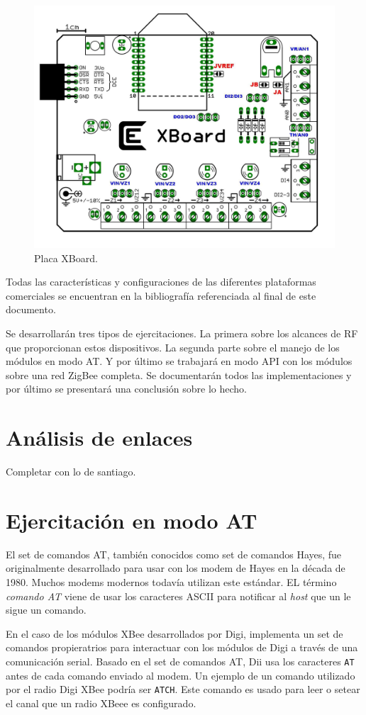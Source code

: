 \documentclass[11pt,oneside,spanish,a4paper]{article}
\begin{document}
\begin{figure}[ht]
  \centering
  \includegraphics[width=.6\textwidth]{img/xboard}
  \caption{Placa XBoard.}
  \label{fig:xboard}
\end{figure}

Todas las características y configuraciones de las diferentes
plataformas comerciales  se encuentran en la bibliografía referenciada
al final de este documento. 

Se desarrollarán tres tipos de ejercitaciones. La primera sobre los
alcances de RF que proporcionan estos dispositivos. La segunda parte
sobre el manejo de los módulos en modo AT. Y por último se trabajará
en modo API con los módulos sobre una red ZigBee completa. Se
documentarán todos las implementaciones y por último se presentará una
conclusión sobre lo hecho.

\section{Análisis de enlaces}
\label{sec:enlace}

Completar con lo de santiago.

\section{Ejercitación en modo AT}
\label{sec:AT}

El set de comandos AT, también conocidos como set de comandos Hayes,
fue originalmente desarrollado para usar con los modem de Hayes en la
década de 1980. Muchos modems modernos todavía utilizan este
estándar. EL término \emph{comando AT}  viene de usar los caracteres
ASCII para notificar al \textsl{host}  que un le sigue un comando. 

En el caso de los módulos XBee desarrollados por Digi, implementa un
set de comandos propieratrios para interactuar con los módulos de
Digi a través de una comunicación serial. Basado en el set de comandos
AT, Dii usa los caracteres \texttt{AT} antes de cada comando enviado
al modem. Un ejemplo de un comando utilizado por el radio Digi XBee
podría ser \texttt{ATCH}. Este comando es usado para leer o setear el
canal que un radio XBeee es configurado\cite{at-cmds}.
\end{document}
